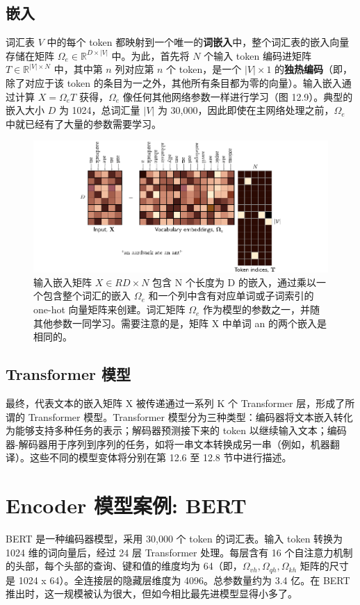 \documentclass[lang=cn,newtx,10pt,scheme=chinese]{elegantbook}
\begin{document}
\subsection{嵌入}
词汇表 \(V\) 中的每个 token 都映射到一个唯一的\textbf{词嵌入}中，整个词汇表的嵌入向量存储在矩阵 \(\Omega_e \in \mathbb{R}^{D \times |V|}\) 中。为此，首先将 \(N\) 个输入 token 编码进矩阵 \(T \in \mathbb{R}^{|V| \times N}\) 中，其中第 \(n\) 列对应第 \(n\) 个 token，是一个 \(|V| \times 1\) 的\textbf{独热编码}（即，除了对应于该 token 的条目为一之外，其他所有条目都为零的向量）。输入嵌入通过计算 \(X = \Omega_e T\) 获得，\(\Omega_e\) 像任何其他网络参数一样进行学习（图 12.9）。典型的嵌入大小 \(D\) 为 1024，总词汇量 \(|V|\) 为 30,000，因此即使在主网络处理之前，\(\Omega_e\) 中就已经有了大量的参数需要学习。

\begin{figure}[ht!]
\centering
\includegraphics[width=0.7\linewidth]{PDFFigures/UDLChap12PDF/TransformerVocabulary.pdf}
\caption{输入嵌入矩阵 \(X \in RD×N\) 包含 N 个长度为 D 的嵌入，通过乘以一个包含整个词汇的嵌入 \(\Omega_e\) 和一个列中含有对应单词或子词索引的 one-hot 向量矩阵来创建。词汇矩阵 \(\Omega_e\) 作为模型的参数之一，并随其他参数一同学习。需要注意的是，矩阵 X 中单词 an 的两个嵌入是相同的。}
\end{figure}


\subsection{Transformer 模型}
最终，代表文本的嵌入矩阵 X 被传递通过一系列 K 个 Transformer 层，形成了所谓的 Transformer 模型。Transformer 模型分为三种类型：编码器将文本嵌入转化为能够支持多种任务的表示；解码器预测接下来的 token 以继续输入文本；编码器-解码器用于序列到序列的任务，如将一串文本转换成另一串（例如，机器翻译）。这些不同的模型变体将分别在第 12.6 至 12.8 节中进行描述。


\section{Encoder 模型案例: BERT}
BERT 是一种编码器模型，采用 30,000 个 token 的词汇表。输入 token 转换为 1024 维的词向量后，经过 24 层 Transformer 处理。每层含有 16 个自注意力机制的头部，每个头部的查询、键和值的维度均为 64（即，\(\Omega_{vh}, \Omega_{qh}, \Omega_{kh}\) 矩阵的尺寸是 1024 x 64）。全连接层的隐藏层维度为 4096。总参数量约为 3.4 亿。在 BERT 推出时，这一规模被认为很大，但如今相比最先进模型显得小多了。
\end{document}
